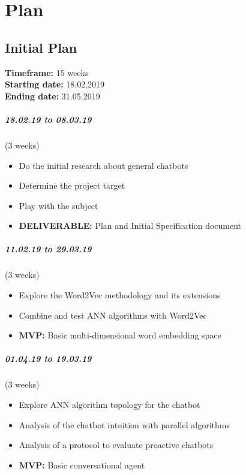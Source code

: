 \chapter{Plan}
\label{chap:plan}


\section{Initial Plan}
\textbf{Timeframe:} 15 weeks\\
\textbf{Starting date:} 18.02.2019\\
\textbf{Ending date:} 31.05.2019

\paragraph{18.02.19 to 08.03.19} (3 weeks) 
\begin{itemize}
	\item Do the initial research about general chatbots
	\item Determine the project target
	\item Play with the subject
	\item \textbf{DELIVERABLE:} Plan and Initial Specification document
\end{itemize}

\paragraph{11.02.19 to 29.03.19} (3 weeks)
\begin{itemize}
	\item Explore the Word2Vec methodology and its extensions
	\item Combine and test ANN algorithms with Word2Vec
	\item \textbf{MVP:} Basic multi-dimensional word embedding space
\end{itemize}

\paragraph{01.04.19 to 19.03.19} (3 weeks)
\begin{itemize}
	\item Explore ANN algorithm topology for the chatbot
	\item Analysis of the chatbot intuition with parallel algorithms
	\item Analysis of a protocol to evaluate proactive chatbots
	\item \textbf{MVP:} Basic conversational agent
\end{itemize}

